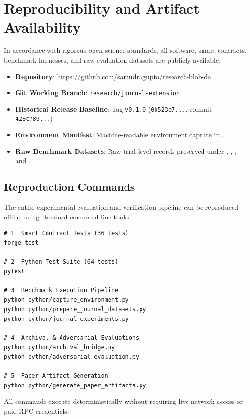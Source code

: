 \section{Reproducibility and Artifact Availability}
\label{sec:reproducibility}

In accordance with rigorous open-science standards, all software, smart contracts, benchmark harnesses, and raw evaluation datasets are publicly available:
\begin{itemize}
    \item \textbf{Repository}: \url{https://github.com/samudragupto/research-blob-da}
    \item \textbf{Git Working Branch}: \texttt{research/journal-extension}
    \item \textbf{Historical Release Baseline}: Tag \texttt{v0.1.0} (\texttt{0b523e7...}, commit \texttt{428c789...})
    \item \textbf{Environment Manifest}: Machine-readable environment capture in .
    \item \textbf{Raw Benchmark Datasets}: Raw trial-level records preserved under , , , and .
\end{itemize}

\subsection{Reproduction Commands}
The entire experimental evaluation and verification pipeline can be reproduced offline using standard command-line tools:
\begin{verbatim}
# 1. Smart Contract Tests (36 tests)
forge test

# 2. Python Test Suite (64 tests)
pytest

# 3. Benchmark Execution Pipeline
python python/capture_environment.py
python python/prepare_journal_datasets.py
python python/journal_experiments.py

# 4. Archival & Adversarial Evaluations
python python/archival_bridge.py
python python/adversarial_evaluation.py

# 5. Paper Artifact Generation
python python/generate_paper_artifacts.py
\end{verbatim}
All commands execute deterministically without requiring live network access or paid RPC credentials.
